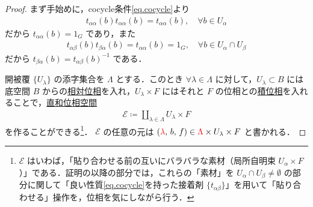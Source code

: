 \documentclass[geometry_main]{subfiles}
\begin{document}
\begin{proof}
	まず手始めに，cocycle条件\eqref{eq.cocycle}より
	\begin{align}
		t_{\alpha\alpha}(b) t_{\alpha\alpha} (b) = t_{\alpha\alpha}(b),\quad \forall b \in U_\alpha
	\end{align}
	だから $t_{\alpha\alpha}(b) = 1_G$ であり，また
	\begin{align}
		t_{\alpha\beta}(b) t_{\beta\alpha} (b) = t_{\alpha\alpha}(b) = 1_G,\quad \forall b \in U_\alpha \cap U_\beta
	\end{align}
	だから $t_{\beta\alpha}(b) = t_{\alpha\beta}(b)^{-1}$ である．

	開被覆 $\{U_\lambda\}$ の添字集合を $\Lambda$ とする．このとき $\forall \lambda \in \Lambda$ に対して，$U_\lambda \subset B$ には底空間 $B$ からの\hyperref[def.reltopo]{相対位相}を入れ，$U_\lambda \times F$ にはそれと $F$ の位相との\hyperref[def.prodtopo]{積位相}を入れることで，\hyperref[def.disjoint_topo]{直和位相空間}
	\begin{align}
	\mathcal{E} \coloneqq \coprod_{\lambda \in \Lambda} U_\lambda \times F
	\end{align}
	を作ることができる\footnote{$\mathcal{E}$ はいわば，「貼り合わせる前の互いにバラバラな素材（局所自明束 $U_\alpha \times F$）」である．証明の以降の部分では，これらの「素材」を $U_\alpha \cap U_\beta \neq \emptyset$ の部分に関して「良い性質\eqref{eq.cocycle}を持った接着剤 $\{ t_{\alpha\beta} \}$」を用いて「貼り合わせる」操作を，位相を気にしながら行う．}．
	$\mathcal{E}$ の任意の元は $(\textcolor{red}{\lambda},\, b,\, f) \in  \textcolor{red}{\Lambda} \times  U_\lambda \times F$ と書かれる．


\end{proof}
\end{document}
